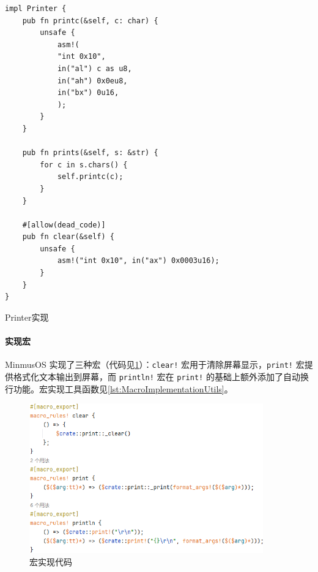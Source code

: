 \begin{listing}[htbp]
    \begin{verbatim}
impl Printer {
    pub fn printc(&self, c: char) {
        unsafe {
            asm!(
            "int 0x10",
            in("al") c as u8,
            in("ah") 0x0eu8,
            in("bx") 0u16,
            );
        }
    }

    pub fn prints(&self, s: &str) {
        for c in s.chars() {
            self.printc(c);
        }
    }

    #[allow(dead_code)]
    pub fn clear(&self) {
        unsafe {
            asm!("int 0x10", in("ax") 0x0003u16);
        }
    }
}
    \end{verbatim}
    \caption{Printer实现}\label{lst:PrinterImplementation}
\end{listing}

\paragraph{实现宏}

MinmusOS 实现了三种宏（代码见\cref{fig:MacroImplementation}）：\texttt{clear!} 宏用于清除屏幕显示，\texttt{print!} 宏提供格式化文本输出到屏幕，而 \texttt{println!} 宏在 \texttt{print!} 的基础上额外添加了自动换行功能。宏实现工具函数见\cref{lst:MacroImplementationUtils}。

\begin{figure}[htbp]
    \centering
    \includegraphics[width=0.9\textwidth]{figures/MacroImplementation.png}
    \caption{宏实现代码}
    \label{fig:MacroImplementation}
\end{figure}


